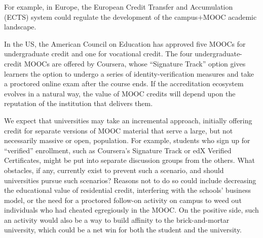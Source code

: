 For example, in Europe, the European Credit Transfer and Accumulation
(ECTS) system could regulate the
development of the campus$+$MOOC academic landscape.  

In the US, the
American Council on Education has approved five
MOOCs for undergraduate credit and one for vocational credit.  
The four undergraduate-credit MOOCs are
offered by Coursera, whose ``Signature Track'' option gives learners the
option to  undergo  a series of identity-verification measures and take
a proctored online exam after the course ends.
If the accreditation ecosystem evolves in a natural
way, the value of MOOC credits will depend upon the reputation of the
institution that delivers them.

We expect that universities may take an
incremental approach, initially offering
credit for separate versions of MOOC material that serve a large, but
not necessarily massive or open, population.
For example, students who sign up for ``verified''
enrollment, such as Coursera's Signature Track or edX Verified
Certificates, might be put
into separate discussion groups from the others.  
What obstacles, if any, currently exist to prevent such a scenario, and
should universities pursue such scenarios?
Reasons not to do so could include decreasing the educational value of
residential credit, interfering with the schools' business model, or the
need for a proctored follow-on activity on campus to
weed out individuals who had cheated egregiously in the MOOC.  On the
positive side, such an activity would also be a way to build affinity to
the brick-and-mortar university, which could be a net win for both the
student and the university.
 


